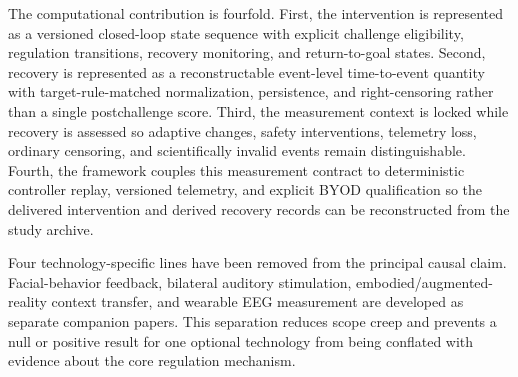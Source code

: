 The computational contribution is fourfold. First, the intervention is represented as a versioned closed-loop state sequence with explicit challenge eligibility, regulation transitions, recovery monitoring, and return-to-goal states. Second, recovery is represented as a reconstructable event-level time-to-event quantity with target-rule-matched normalization, persistence, and right-censoring rather than a single postchallenge score. Third, the measurement context is locked while recovery is assessed so adaptive changes, safety interventions, telemetry loss, ordinary censoring, and scientifically invalid events remain distinguishable. Fourth, the framework couples this measurement contract to deterministic controller replay, versioned telemetry, and explicit BYOD qualification so the delivered intervention and derived recovery records can be reconstructed from the study archive.

Four technology-specific lines have been removed from the principal causal claim. Facial-behavior feedback, bilateral auditory stimulation, embodied/augmented-reality context transfer, and wearable EEG measurement are developed as separate companion papers. This separation reduces scope creep and prevents a null or positive result for one optional technology from being conflated with evidence about the core regulation mechanism.
